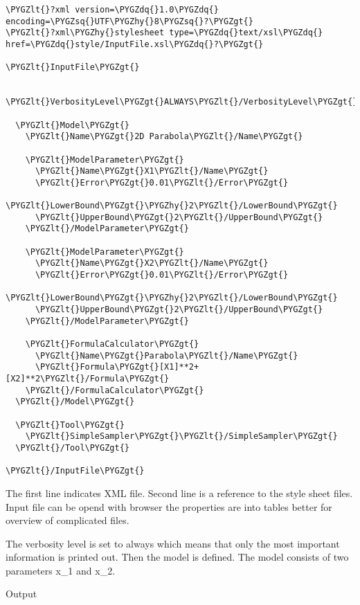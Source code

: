 \documentclass[letterpaper,10pt,english]{sphinxmanual}
\def\PYGZlt{\char`\<}
\def\PYGZgt{\char`\>}
\def\PYGZhy{\char`\-}
\def\PYGZsq{\char`\'}
\def\PYGZdq{\char`\"}
\renewcommand\PYGZsq{\textquotesingle}
\begin{document}
\begin{Verbatim}[commandchars=\\\{\}]
\PYGZlt{}?xml version=\PYGZdq{}1.0\PYGZdq{} encoding=\PYGZsq{}UTF\PYGZhy{}8\PYGZsq{}?\PYGZgt{}
\PYGZlt{}?xml\PYGZhy{}stylesheet type=\PYGZdq{}text/xsl\PYGZdq{} href=\PYGZdq{}style/InputFile.xsl\PYGZdq{}?\PYGZgt{}

\PYGZlt{}InputFile\PYGZgt{}

  \PYGZlt{}VerbosityLevel\PYGZgt{}ALWAYS\PYGZlt{}/VerbosityLevel\PYGZgt{}

  \PYGZlt{}Model\PYGZgt{}
    \PYGZlt{}Name\PYGZgt{}2D Parabola\PYGZlt{}/Name\PYGZgt{}

    \PYGZlt{}ModelParameter\PYGZgt{}
      \PYGZlt{}Name\PYGZgt{}X1\PYGZlt{}/Name\PYGZgt{}
      \PYGZlt{}Error\PYGZgt{}0.01\PYGZlt{}/Error\PYGZgt{}
      \PYGZlt{}LowerBound\PYGZgt{}\PYGZhy{}2\PYGZlt{}/LowerBound\PYGZgt{}
      \PYGZlt{}UpperBound\PYGZgt{}2\PYGZlt{}/UpperBound\PYGZgt{}
    \PYGZlt{}/ModelParameter\PYGZgt{}

    \PYGZlt{}ModelParameter\PYGZgt{}
      \PYGZlt{}Name\PYGZgt{}X2\PYGZlt{}/Name\PYGZgt{}
      \PYGZlt{}Error\PYGZgt{}0.01\PYGZlt{}/Error\PYGZgt{}
      \PYGZlt{}LowerBound\PYGZgt{}\PYGZhy{}2\PYGZlt{}/LowerBound\PYGZgt{}
      \PYGZlt{}UpperBound\PYGZgt{}2\PYGZlt{}/UpperBound\PYGZgt{}
    \PYGZlt{}/ModelParameter\PYGZgt{}

    \PYGZlt{}FormulaCalculator\PYGZgt{}
      \PYGZlt{}Name\PYGZgt{}Parabola\PYGZlt{}/Name\PYGZgt{}
      \PYGZlt{}Formula\PYGZgt{}[X1]**2+[X2]**2\PYGZlt{}/Formula\PYGZgt{}
    \PYGZlt{}/FormulaCalculator\PYGZgt{}
  \PYGZlt{}/Model\PYGZgt{}

  \PYGZlt{}Tool\PYGZgt{}
    \PYGZlt{}SimpleSampler\PYGZgt{}\PYGZlt{}/SimpleSampler\PYGZgt{}
  \PYGZlt{}/Tool\PYGZgt{}

\PYGZlt{}/InputFile\PYGZgt{}
\end{Verbatim}

The first line indicates XML file. Second line is a reference to the style sheet files. Input file
can be opend with browser the properties are into tables better for overview of complicated files.

The verbosity level is set to always which means that only the most important information is printed
out. Then the model is defined. The model consists of two parameters x\_1 and x\_2.

Output
\end{document}
